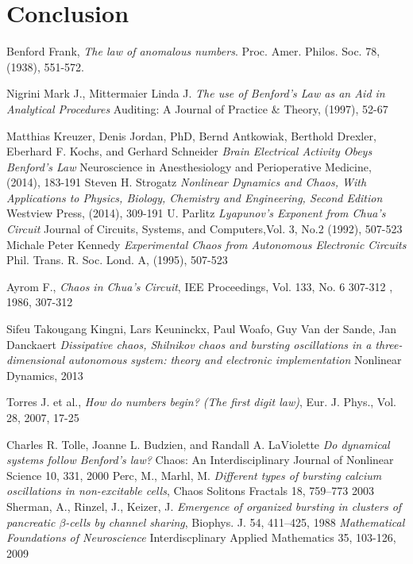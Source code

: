\section{Conclusion}

\begin{thebibliography}{1}

  Benford Frank,
  \emph{The law of anomalous numbers}.
  Proc. Amer. Philos. Soc. 78,
  (1938),
  551-572.

  Nigrini Mark J., Mittermaier Linda J.
  \emph{The use of Benford's Law as an Aid in Analytical Procedures}
  Auditing: A Journal of Practice \& Theory,
  (1997),
  52-67

  Matthias Kreuzer, Denis Jordan, PhD, Bernd Antkowiak, Berthold Drexler, Eberhard F. Kochs, and Gerhard Schneider
  \emph{Brain Electrical Activity Obeys Benford's Law}
  Neuroscience in Anesthesiology and Perioperative Medicine,
  (2014),
  183-191
 Steven H. Strogatz
  \emph{Nonlinear Dynamics and Chaos, With Applications to Physics, Biology, Chemistry and Engineering, Second Edition}
  Westview Press,
  (2014),
  309-191
  U. Parlitz
  \emph{Lyapunov's Exponent from Chua's Circuit}
  Journal of Circuits, Systems, and Computers,Vol. 3, No.2
  (1992),
  507-523
  Michale Peter Kennedy
  \emph{Experimental Chaos from Autonomous Electronic Circuits}
  Phil. Trans. R. Soc. Lond. A,
  (1995),
  507-523

Ayrom F.,
 \emph{Chaos in Chua's Circuit},
 IEE Proceedings, Vol. 133, No. 6 307-312
 , 1986,
 307-312


Sifeu Takougang Kingni, Lars Keuninckx, Paul Woafo,  Guy Van der Sande, Jan Danckaert
\emph{Dissipative chaos, Shilnikov chaos and bursting oscillations
in a three-dimensional autonomous system: theory
and electronic implementation}
Nonlinear Dynamics,
2013

 Torres J. et al.,
 \emph{How do numbers begin? (The first digit law)},
  Eur. J. Phys., Vol. 28,
   2007,
   17-25

Charles R. Tolle, Joanne L. Budzien, and Randall A. LaViolette
\emph{Do dynamical systems follow Benford’s law?}
Chaos: An Interdisciplinary Journal of Nonlinear Science 10,
 331,
2000
Perc, M., Marhl, M.
\emph{ Different types of bursting calcium
oscillations in non-excitable cells},
Chaos Solitons Fractals 18,
 759–773
2003
Sherman, A., Rinzel, J., Keizer, J.
\emph{ Emergence of organized bursting in clusters of pancreatic $\beta$-cells by channel sharing},
Biophys. J. 54, 411–425,
1988
\emph{Mathematical Foundations of Neuroscience}
Interdiscplinary Applied Mathematics 35,
103-126,
2009
\end{thebibliography}

% 
